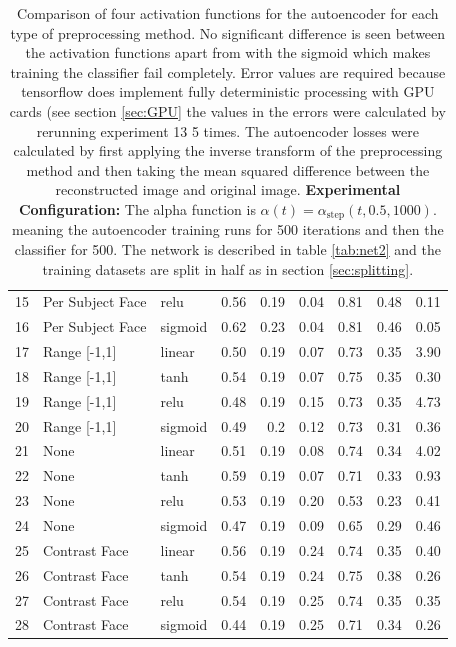 \begin{table}[!h]
{\begin{tabular}{lllrrrrrr}
         15&Per Subject Face  & relu   &    0.56 &   0.19 &     0.04 &    0.81 &   0.48 &     0.11 \\
         16& Per Subject Face      & sigmoid &    0.62 &   0.23 &     0.04 &    0.81 &   0.46 &     0.05 \\
         \hline
         17&Range [-1,1]      & linear &    0.50 &   0.19 &     0.07 &    0.73 &   0.35 &     3.90 \\
         18&Range [-1,1]      & tanh   &    0.54 &   0.19 &     0.07 &    0.75 &   0.35 &     0.30 \\
         19&Range [-1,1]      & relu   &    0.48 &   0.19 &     0.15 &    0.73 &   0.35 &     4.73 \\
         20& Range [-1,1]      & sigmoid &    0.49 &   0.2  &     0.12 &    0.73 &   0.31 &     0.36 \\
         \hline
         21&None              & linear &    0.51 &   0.19 &     0.08 &    0.74 &   0.34 &     4.02 \\
         22&None              & tanh   &    0.59 &   0.19 &     0.07 &    0.71 &   0.33 &     0.93 \\
         23&None              & relu   &    0.53 &   0.19 &     0.20 &    0.53 &   0.23 &     0.41 \\
         24& None       & sigmoid &    0.47 &   0.19 &     0.09 &    0.65 &   0.29 &     0.46 \\
         \hline
         25&Contrast Face     & linear &    0.56 &   0.19 &     0.24 &    0.74 &   0.35 &     0.40 \\
         26&Contrast Face     & tanh   &    0.54 &   0.19 &     0.24 &    0.75 &   0.38 &     0.26 \\
         27&Contrast Face     & relu   &    0.54 &   0.19 &     0.25 &    0.74 &   0.35 &     0.35 \\
         28& Contrast Face    & sigmoid &    0.44 &   0.19 &     0.25 &    0.71 &   0.34 &     0.26 \\
         \hline
        \end{tabular}
          \caption{Comparison of four activation functions for the autoencoder for each type of preprocessing method.
          No significant difference is seen between the activation functions apart from with the sigmoid
          which makes training the classifier fail completely.
          Error values are required because tensorflow does implement fully deterministic
          processing with GPU cards (see section \ref{sec:GPU} the values in the errors were
          calculated by rerunning experiment 13 5 times. The autoencoder losses were calculated
          by first applying the inverse transform of the preprocessing method and then taking the mean squared
          difference between the reconstructed image and original image. {\bf Experimental Configuration:}
          The alpha function is $\alpha(t)=\alpha_{\text{step}}(t,0.5,1000)$.
          meaning the autoencoder training runs for 500 iterations and then the classifier for 500.
          The network is described in table \ref{tab:net2} and the training datasets are split in half as in section
          \ref{sec:splitting}.}
      \label{tab:psearch} }
      \end{table}
